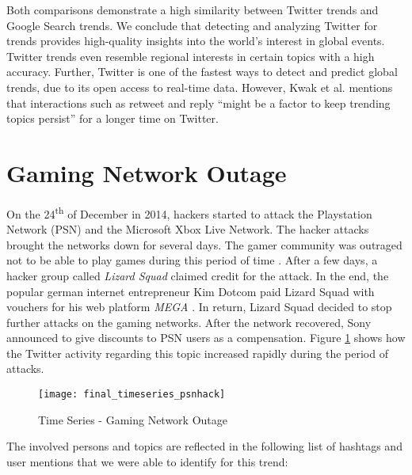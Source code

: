 Both comparisons demonstrate a high similarity between Twitter trends and Google Search trends. We conclude that detecting and analyzing Twitter for trends provides high-quality insights into the world’s interest in global events. Twitter trends even resemble regional interests in certain topics with a high accuracy. Further, Twitter is one of the fastest ways to detect and predict global trends, due to its open access to real-time data. However, Kwak et al. mentions that interactions such as retweet and reply \enquote{might be a factor to keep trending topics persist} for a longer time on Twitter.

\section{Gaming Network Outage}
\label{sec:christmas-network-outage}
On the 24\textsuperscript{th} of December in 2014, hackers started to attack the Playstation Network (PSN) and the Microsoft Xbox Live Network. The hacker attacks brought the networks down for several days. The gamer community was outraged not to be able to play games during this period of time \cite{wool2014sony}. After a few days, a hacker group called \textit{Lizard Squad} claimed credit for the attack. In the end, the popular german internet entrepreneur Kim Dotcom paid Lizard Squad with vouchers for his web platform \textit{MEGA} \cite{Dotcom2014}. In return, Lizard Squad decided to stop further attacks on the gaming networks. After the network recovered, Sony announced to give discounts to PSN users as a compensation. Figure \ref{fig:christmas-network-outage-time-series} shows how the Twitter activity regarding this topic increased rapidly during the period of attacks.

\begin{figure}[H]
  \centering
        \texttt{[image: final\_timeseries\_psnhack]}
  \caption[Time Series - Gaming Network Outage]{Time Series - Gaming Network Outage}
  \label{fig:christmas-network-outage-time-series}
  \vspace{-1.3em}
\end{figure}

The involved persons and topics are reflected in the following list of hashtags and user mentions that we were able to identify for this trend:


